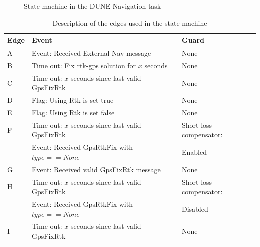 \newpage
\begin{figure}[H]
\def\svgwidth{\textwidth} %

\caption{State machine in the DUNE Navigation task}
\label{Fig:NavState}
\end{figure}
\begin{table}[H]

    \begin{tabular}{ | p{1cm} | p{8cm} | | p{4cm} |}
    \hline
    \textbf{Edge} 	& \textbf{Event} 										& \textbf{Guard} \\ \hline
    A 				& Event: Received External Nav message 					& None \\ \hline
    B 				& Time out: Fix \gls{rtk-gps} solution for $x$ seconds 	& None \\ \hline
    C 				& Time out: $x$ seconds since last valid GpsFixRtk 		& None \\ \hline
    D 				& Flag: Using Rtk is set true& None \\ \hline
    E 				& Flag: Using Rtk is set false& None \\ \hline
    F 				& Time out: $x$ seconds since last valid GpsFixRtk 		& Short loss compensator:\\ 
      				& Event: Received GpsRtkFix with $type==None$ 			& Enabled\\ \hline
    G 				& Event: Received valid GpsFixRtk message				& None \\ \hline
    H 				& Time out: $x$ seconds since last valid GpsFixRtk 		& Short loss compensator:\\
    				& Event: Received GpsRtkFix with $type==None$			& Disabled \\ \hline
    I 				& Time out: $x$ seconds since last valid GpsFixRtk 		& None \\ \hline
    \end{tabular}

\caption{Description of the edges used in the state machine}
\label{Tb:Nav state edge}
\end{table}
